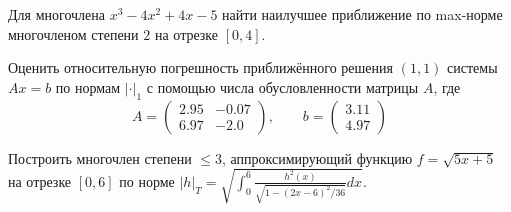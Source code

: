 \begin{problem}
    Для многочлена $x^3 - 4x^2 + 4x - 5$ найти наилучшее приближение по
    max-норме многочленом степени $2$ на отрезке $[0, 4]$.
\end{problem}


\begin{problem}
    Оценить относительную погрешность приближённого решения $(1, 1)$ системы
    $Ax = b$ по нормам $|\cdot|_1$ с помощью числа обусловленности матрицы
    $A$, где
    \begin{equation*}
        A =
        \begin{pmatrix}
            2.95 & -0.07\\
            6.97 & -2.0
        \end{pmatrix}
        , \qquad b =
        \begin{pmatrix}
            3.11\\
            4.97
        \end{pmatrix}
    \end{equation*}
\end{problem}


\begin{problem}
    Построить многочлен степени $\leq 3$, аппроксимирующий функцию
    $f = \sqrt{5x + 5}$ на отрезке $[0, 6]$ по норме
    $|h|_T = \sqrt{\int_0^6{
        \frac{h^2(x)}{\sqrt{1 - (2x - 6)^2/36}}
        dx
    }}$.
\end{problem}